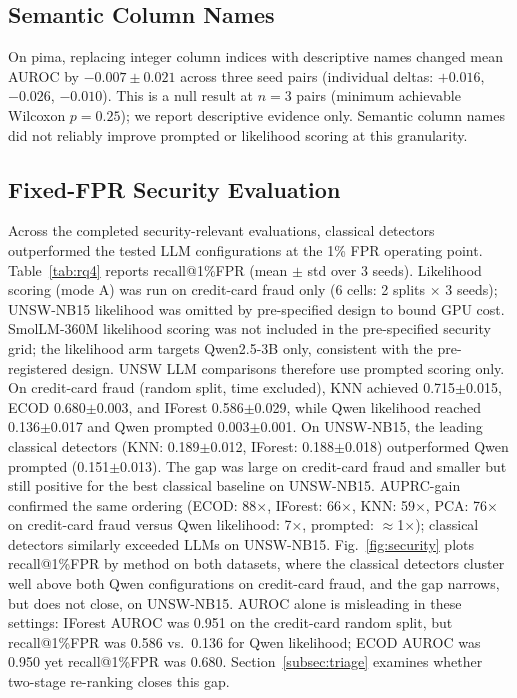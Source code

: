\documentclass[conference]{IEEEtran}
\begin{document}
\subsection{Semantic Column Names}
On pima, replacing integer column indices with descriptive names changed mean AUROC by $-0.007\pm0.021$ across three seed pairs (individual deltas: $+0.016$, $-0.026$, $-0.010$).
This is a null result at $n=3$ pairs (minimum achievable Wilcoxon $p=0.25$); we report descriptive evidence only.
Semantic column names did not reliably improve prompted or likelihood scoring at this granularity.

\subsection{Fixed-FPR Security Evaluation}
Across the completed security-relevant evaluations, classical detectors outperformed the tested LLM configurations at the 1\% FPR operating point.
Table~\ref{tab:rq4} reports recall@1\%FPR (mean $\pm$ std over 3 seeds).
Likelihood scoring (mode A) was run on credit-card fraud only (6 cells: 2 splits $\times$ 3 seeds); UNSW-NB15 likelihood was omitted by pre-specified design to bound GPU cost.
SmolLM-360M likelihood scoring was not included in the pre-specified security grid; the likelihood arm targets Qwen2.5-3B only, consistent with the pre-registered design.
UNSW LLM comparisons therefore use prompted scoring only.
On credit-card fraud (random split, time excluded), KNN achieved 0.715$\pm$0.015, ECOD 0.680$\pm$0.003, and IForest 0.586$\pm$0.029, while Qwen likelihood reached 0.136$\pm$0.017 and Qwen prompted 0.003$\pm$0.001.
On UNSW-NB15, the leading classical detectors (KNN: 0.189$\pm$0.012, IForest: 0.188$\pm$0.018) outperformed Qwen prompted (0.151$\pm$0.013).
The gap was large on credit-card fraud and smaller but still positive for the best classical baseline on UNSW-NB15.
AUPRC-gain confirmed the same ordering (ECOD: 88$\times$, IForest: 66$\times$, KNN: 59$\times$, PCA: 76$\times$ on credit-card fraud versus Qwen likelihood: 7$\times$, prompted: ${\approx}$1$\times$); classical detectors similarly exceeded LLMs on UNSW-NB15.
Fig.~\ref{fig:security} plots recall@1\%FPR by method on both datasets, where the classical detectors cluster well above both Qwen configurations on credit-card fraud, and the gap narrows, but does not close, on UNSW-NB15.
AUROC alone is misleading in these settings: IForest AUROC was 0.951 on the credit-card random split, but recall@1\%FPR was 0.586 vs.\ 0.136 for Qwen likelihood; ECOD AUROC was 0.950 yet recall@1\%FPR was 0.680.
Section~\ref{subsec:triage} examines whether two-stage re-ranking closes this gap.
\end{document}
